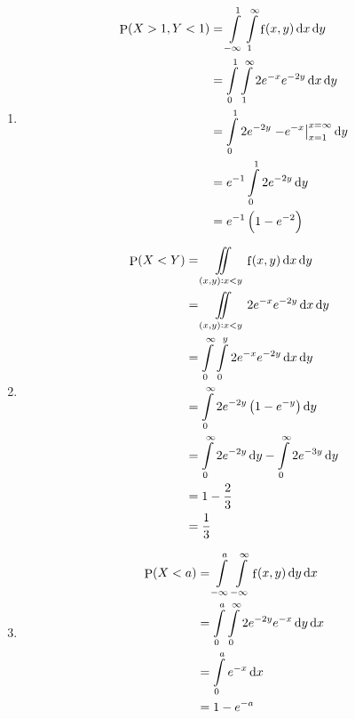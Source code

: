 \documentclass[titlepage, fleqn, a4paper, 12pt, twoside]{article}
\theoremstyle{definition}
\theoremstyle{theorem}
\DeclareMathOperator{\prob}{\mathrm{P}}
\DeclareMathOperator{\pdf}{\mathrm{f}}
\begin{document}
\begin{solution}
	\begin{enumerate}[leftmargin=*]
		\item
			\begin{align*}
				\prob(X > 1 , Y < 1) & = \int\limits_{-\infty}^{1} \int\limits_{1}^{\infty} \pdf(x,y) \dif x \dif y        \\
                                                     & = \int\limits_{0}^{1} \int\limits_{1}^{\infty} 2 e^{-x} e^{-2 y} \dif x \dif y      \\
                                                     & = \int\limits_{0}^{1} 2 e^{-2 y} \left. -e^{-x} \right|_{x = 1}^{x = \infty} \dif y \\
                                                     & = e^{-1} \int\limits_{0}^{1} 2 e^{-2 y} \dif y                                      \\
                                                     & = e^{-1} \left( 1 - e^{-2} \right)
			\end{align*}
		\item
			\begin{align*}
				\prob(X < Y) & = \iint\limits_{(x,y) : x < y} \pdf(x,y) \dif x \dif y                                    \\
                                             & = \iint\limits_{(x,y) : x < y} 2 e^{-x} e^{-2 y} \dif x \dif y                            \\
                                             & = \int\limits_{0}^{\infty} \int\limits_{0}^{y} 2 e^{-x} e^{-2 y} \dif x \dif y            \\
                                             & = \int\limits_{0}^{\infty} 2 e^{-2 y} \left( 1 - e^{-y} \right) \dif y                    \\
                                             & = \int\limits_{0}^{\infty} 2 e^{-2 y} \dif y - \int\limits_{0}^{\infty} 2 e^{-3 y} \dif y \\
                                             & = 1 - \frac{2}{3}                                                                         \\
                                             & = \frac{1}{3}
			\end{align*}
		\item
			\begin{align*}
				\prob(X < a) & = \int\limits_{-\infty}^{a} \int\limits_{-\infty}^{\infty} \pdf(x,y) \dif y \dif x \\
                                             & = \int\limits_{0}^{a} \int\limits_{0}^{\infty} 2 e^{-2 y} e^{-x} \dif y \dif x     \\
                                             & = \int\limits_{0}^{a} e^{-x} \dif x                                                \\
                                             & = 1 - e^{-a}
			\end{align*}
	\end{enumerate}
\end{solution}
\end{document}
